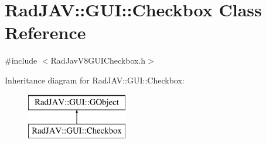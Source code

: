 \hypertarget{class_rad_j_a_v_1_1_g_u_i_1_1_checkbox}{}\section{Rad\+J\+AV\+:\+:G\+UI\+:\+:Checkbox Class Reference}
\label{class_rad_j_a_v_1_1_g_u_i_1_1_checkbox}


{\ttfamily \#include $<$Rad\+Jav\+V8\+G\+U\+I\+Checkbox.\+h$>$}

Inheritance diagram for Rad\+J\+AV\+:\+:G\+UI\+:\+:Checkbox\+:\begin{figure}[H]
\begin{center}
\leavevmode
\includegraphics[height=2.000000cm]{class_rad_j_a_v_1_1_g_u_i_1_1_checkbox}
\end{center}
\end{figure}
